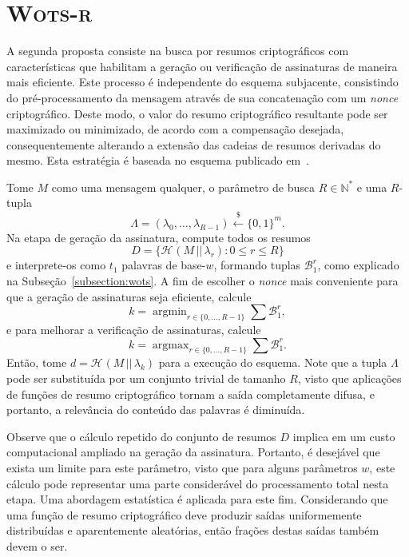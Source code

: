 \documentclass{ufsctex/ufsctex}
\newcommand{\hash}[2][]{\mathcal{H}^{#1} (#2)}
\newcommand{\concat}{\, \vert{} \vert{} \,}
\newcommand{\binwds}[1]{\{0, 1\}^{#1}}
\newcommand{\random}{\stackrel{\$}{\longleftarrow}}
\newcommand{\wotsr}{\textsc{Wots-r}}
\DeclareMathOperator*{\argmin}{argmin}
\DeclareMathOperator*{\argmax}{argmax}
\begin{document}
\section{\wotsr{}}\label{section:wotsr}

A segunda proposta consiste na busca por resumos criptográficos com
características que habilitam a geração ou verificação de assinaturas de
maneira mais eficiente. Este processo é independente do esquema subjacente,
consistindo do pré-processamento da mensagem através de sua concatenação com um
\emph{nonce} criptográfico. Deste modo, o valor do resumo criptográfico
resultante pode ser maximizado ou minimizado, de acordo com a compensação
desejada, consequentemente alterando a extensão das cadeias de resumos
derivadas do mesmo. Esta estratégia é baseada no esquema publicado
em~\cite{Steinwandt:article:2008:oct}.

Tome $M$ como uma mensagem qualquer, o parâmetro de busca $R \in
\mathbb{N}^{*}$ e uma $R$-tupla
\begin{equation}
  \Lambda = (\lambda_0, \dots, \lambda_{R - 1})
    \random{} \binwds{m}.
\end{equation}
Na etapa de geração da assinatura, compute todos os resumos
\begin{equation}
  D = \{\hash{M \concat \lambda_r} : 0 \leq r \leq R\}
\end{equation}
e interprete-os como $t_1$ palavras de base-$w$, formando tuplas
$\mathcal{B}_{1}^{r}$, como explicado na Subseção~\ref{subsection:wots}. A fim
de escolher o \emph{nonce} mais conveniente para que a geração de assinaturas
seja eficiente, calcule
\begin{equation}
  k = \argmin_{r \in \{0, \dots, R - 1\}} \sum \mathcal{B}_{1}^{r},
\end{equation}
e para melhorar a verificação de assinaturas, calcule
\begin{equation}
  k = \argmax_{r \in \{0, \dots, R - 1\}} \sum \mathcal{B}_{1}^{r}.
\end{equation}
Então, tome $d = \hash{M \concat \lambda_k}$ para a execução do esquema. Note
que a tupla $\Lambda$ pode ser substituída por um conjunto trivial de tamanho
$R$, visto que aplicações de funções de resumo criptográfico tornam a saída
completamente difusa, e portanto, a relevância do conteúdo das palavras é
diminuída.

Observe que o cálculo repetido do conjunto de resumos $D$ implica em um custo
computacional ampliado na geração da assinatura. Portanto, é desejável que
exista um limite para este parâmetro, visto que para alguns parâmetros $w$,
este cálculo pode representar uma parte considerável do processamento total
nesta etapa. Uma abordagem estatística é aplicada para este fim. Considerando
que uma função de resumo criptográfico deve produzir saídas uniformemente
distribuídas e aparentemente aleatórias, então frações destas saídas também
devem o ser.
\end{document}
